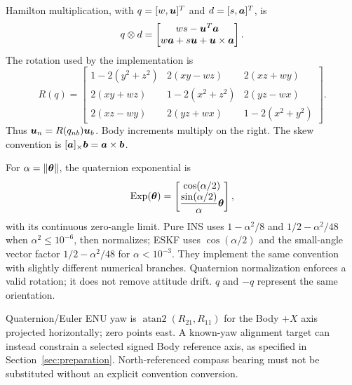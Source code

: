 Hamilton multiplication, with $q=[w,\boldsymbol{u}]^T$ and $d=[s,\boldsymbol{a}]^T$, is
\begin{equation}
q\otimes d=\begin{bmatrix}ws-\boldsymbol{u}^T\boldsymbol{a}\\w\boldsymbol{a}+s\boldsymbol{u}+\boldsymbol{u}\times\boldsymbol{a}\end{bmatrix}.
\end{equation}
The rotation used by the implementation is
\begin{equation}
R(q)=\begin{bmatrix}
1-2(y^2+z^2)&2(xy-wz)&2(xz+wy)\\
2(xy+wz)&1-2(x^2+z^2)&2(yz-wx)\\
2(xz-wy)&2(yz+wx)&1-2(x^2+y^2)
\end{bmatrix}.
\label{eq:rotation}
\end{equation}
Thus $\boldsymbol{u}_n=R(q_{nb})\boldsymbol{u}_b$. Body increments multiply on the right. The skew convention is $[\boldsymbol{a}]_{\times}\boldsymbol{b}=\boldsymbol{a}\times\boldsymbol{b}$.

For $\alpha=\lVert \boldsymbol{\theta}\rVert$, the quaternion exponential is
\begin{equation}
\operatorname{Exp}(\boldsymbol{\theta})=\begin{bmatrix}\cos(\alpha/2)\\
\dfrac{\sin(\alpha/2)}{\alpha}\boldsymbol{\theta}\end{bmatrix},
\label{eq:exp}
\end{equation}
with its continuous zero-angle limit. Pure INS uses $1-\alpha^2/8$ and $1/2-\alpha^2/48$ when $\alpha^2\le10^{-6}$, then normalizes; ESKF uses $\cos(\alpha/2)$ and the small-angle vector factor $1/2-\alpha^2/48$ for $\alpha<10^{-3}$. They implement the same convention with slightly different numerical branches. Quaternion normalization enforces a valid rotation; it does not remove attitude drift. $q$ and $-q$ represent the same orientation.

Quaternion/Euler ENU yaw is $\operatorname{atan2}(R_{21},R_{11})$ for the Body $+X$ axis projected horizontally; zero points east. A known-yaw alignment target can instead constrain a selected signed Body reference axis, as specified in Section~\ref{sec:preparation}. North-referenced compass bearing must not be substituted without an explicit convention conversion.

